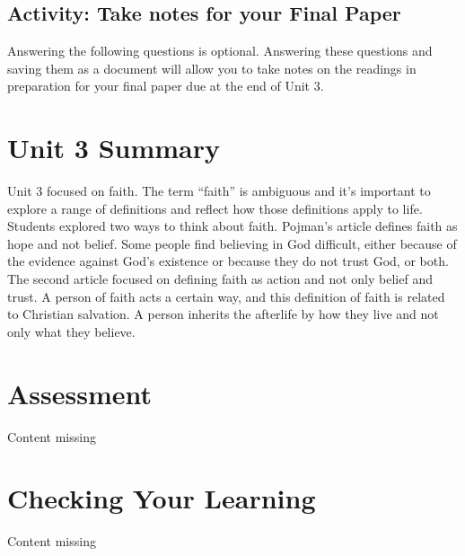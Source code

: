 \documentclass[
]{book}
\begin{document}
\hypertarget{activity-take-notes-for-your-final-paper-1}{%
\subsection*{Activity: Take notes for your Final Paper}\label{activity-take-notes-for-your-final-paper-1}}

\begin{reflect}
Answering the following questions is optional. Answering these questions and saving them as a document will allow you to take notes on the readings in preparation for your final paper due at the end of Unit 3.
\end{reflect}

\hypertarget{unit-3-summary}{%
\section*{Unit 3 Summary}\label{unit-3-summary}}

Unit 3 focused on faith. The term ``faith'' is ambiguous and it's important to explore a range of definitions and reflect how those definitions apply to life. Students explored two ways to think about faith. Pojman's article defines faith as hope and not belief. Some people find believing in God difficult, either because of the evidence against God's existence or because they do not trust God, or both. The second article focused on defining faith as action and not only belief and trust. A person of faith acts a certain way, and this definition of faith is related to Christian salvation. A person inherits the afterlife by how they live and not only what they believe.

\hypertarget{assessment-2}{%
\section*{Assessment}\label{assessment-2}}

{Content missing}

\hypertarget{checking-your-learning-1}{%
\section*{Checking Your Learning}\label{checking-your-learning-1}}

{Content missing}
\end{document}
